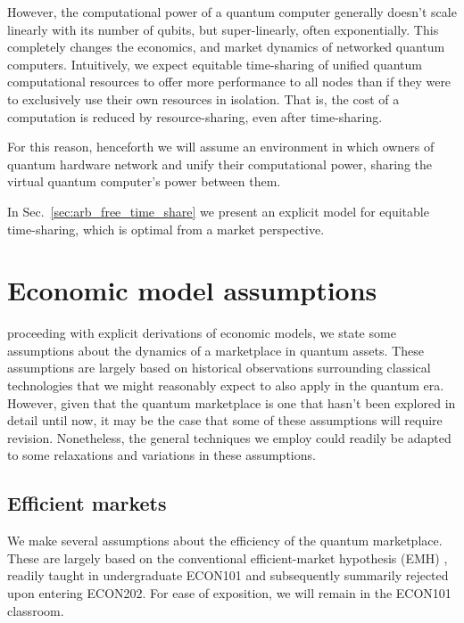 However, the computational power of a quantum computer generally doesn't scale linearly with its number of qubits, but super-linearly, often exponentially. This completely changes the economics, and market dynamics of networked quantum computers. Intuitively, we expect equitable time-sharing of unified quantum computational resources to offer more performance to all nodes than if they were to exclusively use their own resources in isolation. That is, the cost of a computation is reduced by resource-sharing, even after time-sharing.

For this reason, henceforth we will assume an environment in which owners of quantum hardware network and unify their computational power, sharing the virtual quantum computer's power between them.

In Sec.~\ref{sec:arb_free_time_share} we present an explicit model for equitable time-sharing, which is optimal from a market perspective.

%
%

\section{Economic model assumptions}

 proceeding with explicit derivations of economic models, we state some assumptions about the dynamics of a marketplace in quantum assets. These assumptions are largely based on historical observations surrounding classical technologies that we might reasonably expect to also apply in the quantum era. However, given that the quantum marketplace is one that hasn't been explored in detail until now, it may be the case that some of these assumptions will require revision. Nonetheless, the general techniques we employ could readily be adapted to some relaxations and variations in these assumptions.

%
%

\subsection{Efficient markets}\label{sec:eff_markets} 

We make several assumptions about the efficiency of the quantum marketplace. These are largely based on the conventional efficient-market hypothesis (EMH) \cite{???}, readily taught in undergraduate ECON101 and subsequently summarily rejected upon entering ECON202. For ease of exposition, we will remain in the ECON101 classroom.

